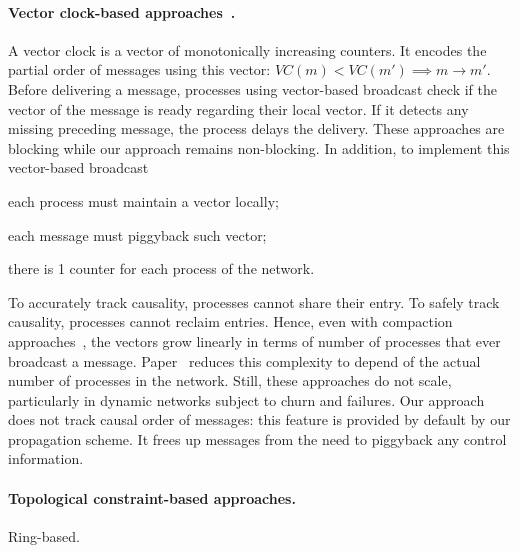 \paragraph{Vector clock-based
  approaches~\cite{fidge1988timestamps,mattern1989virtual}.} A vector clock is a
vector of monotonically increasing counters.  It encodes the partial order of
messages using this vector: $VC(m) < VC(m') \implies m \rightarrow m'$.  Before
delivering a message, processes using vector-based broadcast check if the vector
of the message is ready regarding their local vector. If it detects any missing
preceding message, the process delays the delivery. These approaches are
blocking while our approach remains non-blocking.  In addition, to implement
this vector-based broadcast
\begin{inparaenum}[(i)]
\item each process must maintain a vector locally;
\item each message must piggyback such vector;
\item there is 1 counter for each process of the network.
\end{inparaenum}
To accurately track causality, processes cannot share their entry. To safely
track causality, processes cannot reclaim entries. Hence, even with compaction
approaches~\cite{singhal1992efficient}, the vectors grow linearly in terms of
number of processes that ever broadcast a
message. Paper~\cite{almeida2008interval} reduces this complexity to depend of
the actual number of processes in the network. Still,
these approaches do not scale, particularly in dynamic networks subject to churn
and failures. Our approach does not track causal order of messages: this feature
is provided by default by our propagation scheme. It frees up messages from the
need to piggyback any control information.




\paragraph{Topological constraint-based approaches.} Ring-based. 

